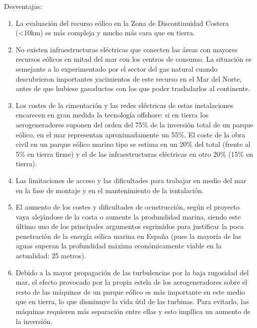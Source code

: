 Desventajas:
\begin{enumerate}
    \item La evaluación del recurso eólico en la Zona de Discontinuidad Costera (<10km) es más compleja y mucho más cara que en tierra.
    \item No existen infraestructuras eléctricas que conecten las áreas con mayores recursos eólicos en mitad del mar con los centros de consumo. La situación es semejante a lo experimentado por el sector del gas natural cuando descubrieron importantes yacimientos de este recurso en el Mar del Norte, antes de que hubiese gasoductos con los que poder trasladarlos al continente.
    \item Los costes de la cimentación y las redes eléctricas de estas instalaciones encarecen en gran medida la tecnología offshore: si en tierra los aerogeneradores suponen del orden del 75\% de la inversión total de un parque eólico, en el mar representan aproximadamente un 55\%. El coste de la obra civil en un parque eólico marino tipo se estima en un 20\% del total (frente al 5\% en tierra firme) y el de las infraestructuras eléctricas en otro 20\% (15\% en tierra).
    \item Las limitaciones de acceso y las dificultades para trabajar en medio del mar en la fase de montaje y en el mantenimiento de la isntalación.
    \item El aumento de los costes y dificultades de ocnstrucción, según el proyecto vaya alejándose de la costa o aumente la produndidad marina, siendo este último uno de los principales argumentos esgrimidos para justificar la poca penetración de la energía eólica marina en España (pues la mayoría de las aguas superan la profundidad máxima económicamente viable en la actualidad: 25 metros).
    \item Debido a la mayor propagación de las turbulencias por la baja rugosidad del mar, el efecto provocado por la propia estela de los aerogeneradores sobre el resto de las máquinas de un parque eólico es más importante en este medio que en tierra, lo que disminuye la vida útil de las turbinas. Para evitarlo, las máquinas requieren más separación entre ellas y esto impllica un aumento de la inversión.
\end{enumerate}